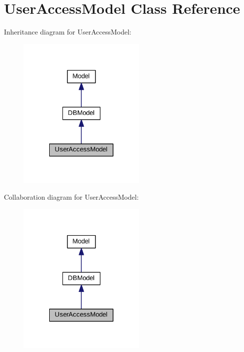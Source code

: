 \hypertarget{classUserAccessModel}{\section{User\+Access\+Model Class Reference}
\label{classUserAccessModel}
}


Inheritance diagram for User\+Access\+Model\+:\nopagebreak
\begin{figure}[H]
\begin{center}
\leavevmode
\includegraphics[width=176pt]{classUserAccessModel__inherit__graph}
\end{center}
\end{figure}


Collaboration diagram for User\+Access\+Model\+:\nopagebreak
\begin{figure}[H]
\begin{center}
\leavevmode
\includegraphics[width=176pt]{classUserAccessModel__coll__graph}
\end{center}
\end{figure}
